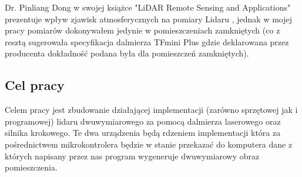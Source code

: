 Dr. Pinliang Dong w swojej książce "LiDAR Remote Sensing and Applications" prezentuje 
wpływ zjawisk atmosferycznych na pomiary Lidaru \cite{dong}, jednak w mojej pracy pomiarów dokonywałem
jedynie w pomieszczeniach zamkniętych (co z resztą sugerowała specyfikacja dalmierza TFmini
Plus gdzie deklarowana przez producenta dokładność podana była dla pomieszczeń zamkniętych).\\

\subsection {Cel pracy}
Celem pracy jest zbudowanie działającej implementacji (zarówno sprzętowej jak i programowej) lidaru
dwuwymiarowego za pomocą dalmierza laserowego oraz silnika krokowego. Te dwa urządzenia będą
rdzeniem implementacji która za pośrednictwem mikrokontrolera będzie w stanie przekazać do komputera
dane z których napisany przez nas program wygeneruje dwuwymiarowy obraz pomieszczenia.